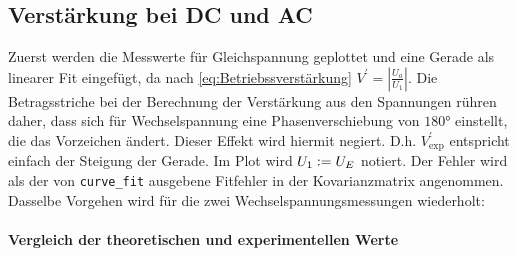 \subsection{Verstärkung bei DC und AC}
Zuerst werden die Messwerte für Gleichspannung geplottet und eine Gerade als linearer Fit eingefügt, da nach \cref{eq:Betriebssverstärkung} \(V^\prime=\left|\frac{U_a}{U_1}\right|\). 
Die Betragsstriche bei der Berechnung der Verstärkung aus den Spannungen rühren daher, dass sich für Wechselspannung eine Phasenverschiebung von \(\ang{180}\) einstellt, die das Vorzeichen ändert. Dieser Effekt wird hiermit negiert.
D.h. \(V^\prime_\text{exp}\) entspricht einfach der Steigung der Gerade. Im Plot wird \(U_1\vcentcolon= U_E\) notiert. Der Fehler wird als der von \verb|curve_fit| ausgebene Fitfehler in der Kovarianzmatrix angenommen.
\newpage
Dasselbe Vorgehen wird für die zwei Wechselspannungsmessungen wiederholt: 
\FloatBarrier

\paragraph{Vergleich der theoretischen und experimentellen Werte}


